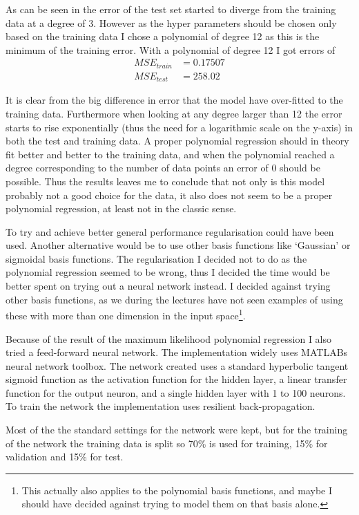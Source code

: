 \documentclass[a4paper, 11pt]{article}
\begin{document}
As can be seen in  the error of the test set started to diverge from the training data at a degree of 3. However as the hyper parameters should be chosen only based on the training data I chose a polynomial of degree 12 as this is the minimum of the training error. With a polynomial of degree 12 I got errors of
\begin{align*}
    MSE_{\mathit{train}} &= 0.17507 \\
    MSE_{\mathit{test}} &= 258.02
\end{align*}

It is clear from the big difference in error that the model have over-fitted to the training data. Furthermore when looking at any degree larger than 12 the error starts to rise exponentially (thus the need for a logarithmic scale on the y-axis) in both the test and training data. A proper polynomial regression should in theory fit better and better to the training data, and when the polynomial reached a degree corresponding to the number of data points an error of 0 should be possible. Thus the results leaves me to conclude that not only  is this model probably not a good choice for the data, it also does not seem to be a proper polynomial regression, at least not in the classic sense.

To try and achieve better general performance regularisation could have been used. Another alternative would be to use other basis functions like `Gaussian' or sigmoidal basis functions. The regularisation I decided not to do as the polynomial regression seemed to be wrong, thus I decided the time would be better spent on trying out a neural network instead. I decided against trying other basis functions, as we during the lectures have not seen examples of using these with more than one dimension in the input space\footnote{This actually also applies to the polynomial basis functions, and maybe I should have decided against trying to model them on that basis alone.}.

Because of the result of the maximum likelihood polynomial regression I also tried a feed-forward neural network. The implementation widely uses MATLABs neural network toolbox. The network created uses a standard hyperbolic tangent sigmoid function as the activation function for the hidden layer, a linear transfer function for the output neuron, and a single hidden layer with 1 to 100 neurons. To train the network the implementation uses resilient back-propagation.

Most of the the standard settings for the network were kept, but for the training of the network the training data is split so 70\% is used for training, 15\% for validation and 15\% for test.
\end{document}
